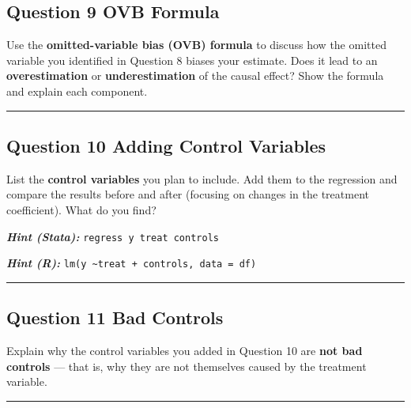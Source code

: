 \documentclass[paper=a4, fontsize=11pt]{scrartcl}
\newcommand{\horrule}[1]{\rule{\linewidth}{#1}}
\begin{document}
\subsection*{Question 9 \quad OVB Formula}

Use the \textbf{omitted-variable bias (OVB) formula} to discuss how the omitted variable you identified in Question 8 biases your estimate. Does it lead to an \textbf{overestimation} or \textbf{underestimation} of the causal effect? Show the formula and explain each component.

\bigskip\horrule{0.4pt}\bigskip


\subsection*{Question 10 \quad Adding Control Variables}

List the \textbf{control variables} you plan to include. Add them to the regression and compare the results before and after (focusing on changes in the treatment coefficient). What do you find?

\medskip
\textit{\textbf{Hint (Stata):}} \texttt{regress y treat controls}

\textit{\textbf{Hint (R):}} \texttt{lm(y \textasciitilde treat + controls, data = df)}

\bigskip\horrule{0.4pt}\bigskip


\subsection*{Question 11 \quad Bad Controls}

Explain why the control variables you added in Question 10 are \textbf{not bad controls} --- that is, why they are not themselves caused by the treatment variable.

\bigskip\horrule{0.4pt}\bigskip

\end{document}
